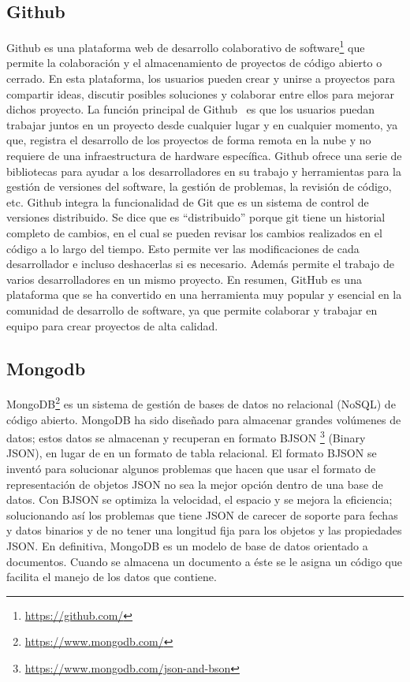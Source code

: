 \documentclass[a4paper, 12pt]{book}
\begin{document}
\subsection{Github} %
\label{sec:github} %

Github es una plataforma web de desarrollo colaborativo de software\footnote{\url{https://github.com/}} que permite la colaboración y el almacenamiento de proyectos de código abierto o cerrado.
En esta plataforma, los usuarios pueden crear y unirse a proyectos para compartir ideas, discutir posibles soluciones y colaborar entre ellos para mejorar dichos proyecto.
La función principal de Github~\cite{astigarraga2022se} es que los usuarios puedan trabajar juntos en un proyecto desde cualquier lugar y en cualquier momento, ya que, registra el desarrollo de los proyectos de forma remota en la nube y no requiere de una infraestructura de hardware específica.
Github ofrece una serie de bibliotecas para ayudar a los desarrolladores en su trabajo y herramientas para la gestión de versiones del software, la gestión de problemas, la revisión de código, etc. 
Github integra la funcionalidad de Git que es un sistema de control de versiones distribuido.
Se dice que es ``distribuido'' porque git tiene un historial completo de cambios, en el cual se pueden revisar los cambios realizados en el código a lo largo del tiempo. 
Esto permite ver las modificaciones de cada desarrollador e incluso deshacerlas si es necesario. Además permite el trabajo de varios desarrolladores en un mismo proyecto.
En resumen, GitHub es una plataforma que se ha convertido en una herramienta muy popular y esencial en la comunidad de desarrollo de software, ya que permite colaborar y trabajar en equipo para crear proyectos de alta calidad.
 

\subsection{Mongodb} %
\label{sec:mongodb} %

MongoDB\footnote{\url{https://www.mongodb.com/}} es un sistema de gestión de bases de datos no relacional (NoSQL) de código abierto. 
MongoDB ha sido diseñado para almacenar grandes volúmenes de datos; estos datos se almacenan y recuperan en formato BJSON \footnote{\url{https://www.mongodb.com/json-and-bson}} (Binary JSON), en lugar de en un formato de tabla relacional.
El formato BJSON se inventó para solucionar algunos problemas que hacen que usar el formato de representación de objetos JSON no sea la mejor opción dentro de una base de datos. 
Con BJSON se optimiza la velocidad, el espacio y se mejora la eficiencia; solucionando así los problemas que tiene JSON de carecer de soporte para fechas y datos binarios y de no tener una longitud fija para los objetos y las propiedades JSON.
En definitiva, MongoDB es un modelo de base de datos orientado a documentos. Cuando se almacena un documento a éste se le asigna un código que facilita el manejo de los datos que contiene.
\end{document}
